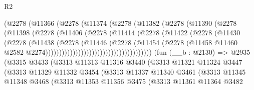 \begin{lexlean}{R2}
\begin{coremodule}
                              (@2278
                                (@11366
                                  (@2278
                                    (@11374
                                      (@2278
                                        (@11382
                                          (@2278
                                            (@11390
                                              (@2278
                                                (@11398
                                                  (@2278
                                                    (@11406
                                                      (@2278
                                                        (@11414
                                                          (@2278
                                                            (@11422
                                                              (@2278
                                                                (@11430
                                                                  (@2278
                                                                    (@11438
                                                                      (@2278
                                                                        (@11446
                                                                          (@2278
                                                                            (@11454
                                                                              (@2278
                                                                                (@11458
                                                                                  @11460
                                                                                  @2582
                                                                                  @2274)))))))))))))))))))))))))))))))))))))))
    (fun (__b : @2130) =>
    @2935
      (@3315
        @3433
        (@3313
          @11313
          @11316
          @3440
          (@3313
            @11321
            @11324
            @3447
            (@3313
              @11329
              @11332
              @3454
              (@3313
                @11337
                @11340
                @3461
                (@3313
                  @11345
                  @11348
                  @3468
                  (@3313
                    @11353
                    @11356
                    @3475
                    (@3313
                      @11361
                      @11364
                      @3482

\end{coremodule}
\end{lexlean}
